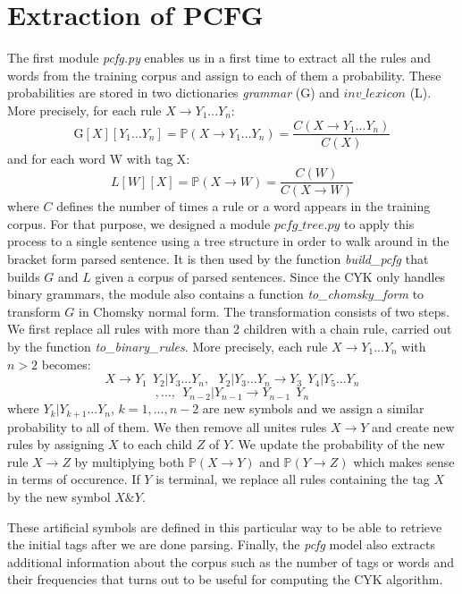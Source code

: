 \documentclass[10pt,twocolumn,letterpaper]{article}
\begin{document}
\section{Extraction of PCFG}
The first module \textit{pcfg.py} enables us in a first time to extract all the rules and words from the training corpus and assign to each of them a probability. These probabilities are stored in two dictionaries \textit{grammar} (G) and $\textit{inv\_lexicon}$ (L). More precisely, for each rule $X \rightarrow Y_{1}...Y_{n}$:
$$ \text{G}[X][Y_{1}...Y_{n}] = \mathbb{P}(X  \rightarrow Y_{1}...Y_{n}) = \frac{C(X \rightarrow Y_{1}...Y_{n})}{C(X)} $$
and for each word W with tag X:
$$L[W][X] = \mathbb{P}(X \rightarrow W) = \frac{C(W)}{C(X \rightarrow W)} $$
where $C$ defines the number of times a rule or a word appears in the training corpus. For that purpose, we designed a module $\textit{pcfg\_tree.py}$ to apply this process to a single sentence using a tree structure in order to walk around in the bracket form parsed sentence. It is then used by the function \textit{build\_pcfg} that builds $G$ and $L$ given a corpus of parsed sentences. Since the CYK only handles binary grammars, the module also contains a function \textit{to\_chomsky\_form} to transform $G$ in Chomsky normal form. The transformation consists of two steps. We first replace all rules with more than 2 children with a chain rule, carried out by the function \textit{to\_binary\_rules}. More precisely, each rule $X \rightarrow Y_{1}...Y_{n}$ with $n > 2$ becomes:
$$ X \rightarrow Y_{1} \:\: Y_{2} | Y_{3}...Y_{n}, \:\:\:  Y_{2} | Y_{3}...Y_{n} \rightarrow Y_{3} \:\: Y_{4} | Y_{5}...Y_{n} $$
$$,..., \:\: Y_{n-2} | Y_{n-1}  \rightarrow Y_{n-1} \:\: Y_{n}$$
where $Y_{k} | Y_{k+1}...Y_{n}$, $k=1,...,n-2$ are new symbols and we assign a similar probability to all of them. We then remove all unites rules $X \rightarrow Y$ and create new rules by assigning $X$ to each child $Z$ of $Y$. We update the probability of the new rule $X \rightarrow Z$ by multiplying both $\mathbb{P}(X \rightarrow Y)$ and $\mathbb{P}(Y \rightarrow Z)$ which makes sense in terms of occurence. If $Y$ is terminal, we replace all rules containing the tag $X$ by the new symbol $X\&Y$.\par
These artificial symbols are defined in this particular way to be able to retrieve the initial tags after we are done parsing. Finally, the \textit{pcfg} model also extracts additional information about the corpus such as the number of tags or words and their frequencies that turns out to be useful for computing the CYK algorithm.
\end{document}
